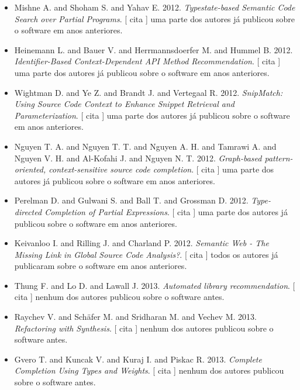 \begin{itemize}
      [
          cita
      ]
nenhum dos autores publicou sobre o software antes.
\item Mishne A. and Shoham S. and Yahav E.
      2012.
        \textit{ Typestate-based Semantic Code Search over Partial Programs}.
      [
          cita
      ]
uma parte dos autores já publicou sobre o software em anos anteriores.
\item Heinemann L. and Bauer V. and Herrmannsdoerfer M. and Hummel B.
      2012.
        \textit{ Identifier-Based Context-Dependent API Method Recommendation}.
      [
          cita
      ]
uma parte dos autores já publicou sobre o software em anos anteriores.
\item Wightman D. and Ye Z. and Brandt J. and Vertegaal R.
      2012.
        \textit{ SnipMatch: Using Source Code Context to Enhance Snippet Retrieval and Parameterization}.
      [
          cita
      ]
uma parte dos autores já publicou sobre o software em anos anteriores.
\item Nguyen T. A. and Nguyen T. T. and Nguyen A. H. and Tamrawi A. and Nguyen V. H. and Al-Kofahi J. and Nguyen N. T.
      2012.
        \textit{ Graph-based pattern-oriented, context-sensitive source code completion}.
      [
          cita
      ]
uma parte dos autores já publicou sobre o software em anos anteriores.
\item Perelman D. and Gulwani S. and Ball T. and Grossman D.
      2012.
        \textit{ Type-directed Completion of Partial Expressions}.
      [
          cita
      ]
uma parte dos autores já publicou sobre o software em anos anteriores.
\item Keivanloo I. and Rilling J. and Charland P.
      2012.
        \textit{ Semantic Web - The Missing Link in Global Source Code Analysis?}.
      [
          cita
      ]
todos os autores já publicaram sobre o software em anos anteriores.
\item Thung F. and Lo D. and Lawall J.
      2013.
        \textit{ Automated library recommendation}.
      [
          cita
      ]
nenhum dos autores publicou sobre o software antes.
\item Raychev V. and Sch\"{a}fer M. and Sridharan M. and Vechev M.
      2013.
        \textit{ Refactoring with Synthesis}.
      [
          cita
      ]
nenhum dos autores publicou sobre o software antes.
\item Gvero T. and Kuncak V. and Kuraj I. and Piskac R.
      2013.
        \textit{ Complete Completion Using Types and Weights}.
      [
          cita
      ]
nenhum dos autores publicou sobre o software antes.

\end{itemize}
